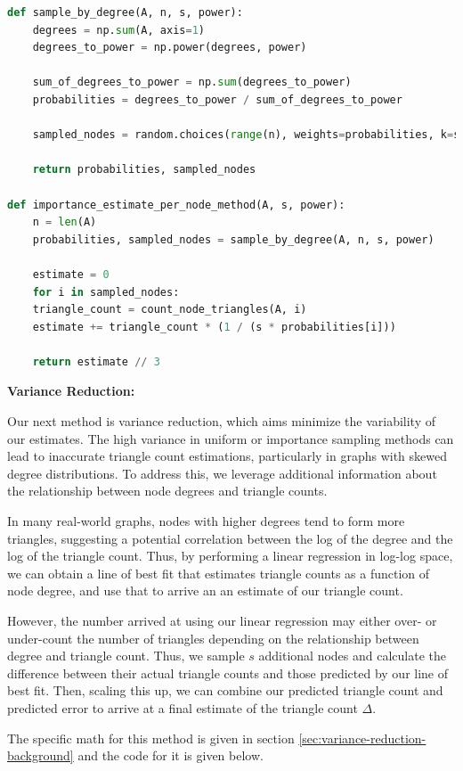 \documentclass[11pt]{article}
\begin{document}
\begin{lstlisting}[language=Python]
def sample_by_degree(A, n, s, power):
    degrees = np.sum(A, axis=1)
    degrees_to_power = np.power(degrees, power)

    sum_of_degrees_to_power = np.sum(degrees_to_power)
    probabilities = degrees_to_power / sum_of_degrees_to_power

    sampled_nodes = random.choices(range(n), weights=probabilities, k=s)

    return probabilities, sampled_nodes

def importance_estimate_per_node_method(A, s, power):
    n = len(A)
    probabilities, sampled_nodes = sample_by_degree(A, n, s, power)

    estimate = 0
    for i in sampled_nodes:
    triangle_count = count_node_triangles(A, i)
    estimate += triangle_count * (1 / (s * probabilities[i]))

    return estimate // 3
\end{lstlisting}

\textbf{Variance Reduction:}
\label{variance-reduction-algo}

Our next method is variance reduction, which aims minimize the variability of our estimates.
The high variance in uniform or importance sampling methods can lead to inaccurate triangle count estimations, particularly in graphs with skewed degree distributions.
To address this, we leverage additional information about the relationship between node degrees and triangle counts.

In many real-world graphs, nodes with higher degrees tend to form more triangles, suggesting a potential correlation between the log of the degree and the log of the triangle count.
Thus, by performing a linear regression in log-log space, we can obtain a line of best fit that estimates triangle counts as a function of node degree, and use that to arrive an an estimate of our triangle count.

However, the number arrived at using our linear regression may either over- or under-count the number of triangles depending on the relationship between degree and triangle count.
Thus, we sample $s$ additional nodes and calculate the difference between their actual triangle counts and those predicted by our line of best fit.
Then, scaling this up, we can combine our predicted triangle count and predicted error to arrive at a final estimate of the triangle count $\Delta$.

The specific math for this method is given in section \ref{sec:variance-reduction-background} and the code for it is given below.
\end{document}
